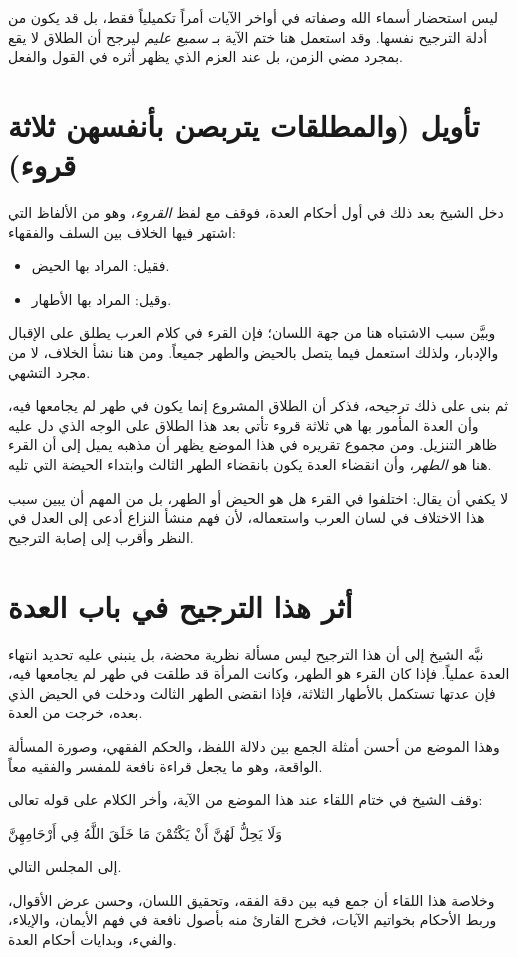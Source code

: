 \begin{fawaid}
ليس استحضار أسماء الله وصفاته في أواخر الآيات أمراً تكميلياً فقط، بل قد يكون من أدلة الترجيح نفسها. وقد استعمل  هنا ختم الآية بـ \textit{سميع عليم} ليرجح أن الطلاق لا يقع بمجرد مضي الزمن، بل عند العزم الذي يظهر أثره في القول والفعل.
\end{fawaid}

\separator

\section{تأويل (والمطلقات يتربصن بأنفسهن ثلاثة قروء)}
دخل الشيخ بعد ذلك في أول أحكام العدة، فوقف مع لفظ \textit{القروء}، وهو من الألفاظ التي اشتهر فيها الخلاف بين السلف والفقهاء:
\begin{itemize}
    \item فقيل: المراد بها الحيض.
    \item وقيل: المراد بها الأطهار.
\end{itemize}

وبيَّن  سبب الاشتباه هنا من جهة اللسان؛ فإن القرء في كلام العرب يطلق على الإقبال والإدبار، ولذلك استعمل فيما يتصل بالحيض والطهر جميعاً. ومن هنا نشأ الخلاف، لا من مجرد التشهي.

ثم بنى على ذلك ترجيحه، فذكر أن الطلاق المشروع إنما يكون في طهر لم يجامعها فيه، وأن العدة المأمور بها هي ثلاثة قروء تأتي بعد هذا الطلاق على الوجه الذي دل عليه ظاهر التنزيل. ومن مجموع تقريره في هذا الموضع يظهر أن مذهبه يميل إلى أن القرء هنا هو \textit{الطهر}، وأن انقضاء العدة يكون بانقضاء الطهر الثالث وابتداء الحيضة التي تليه.

\begin{fawaid}
لا يكفي أن يقال: اختلفوا في القرء هل هو الحيض أو الطهر، بل من المهم أن يبين سبب هذا الاختلاف في لسان العرب واستعماله، لأن فهم منشأ النزاع أدعى إلى العدل في النظر وأقرب إلى إصابة الترجيح.
\end{fawaid}

\section{أثر هذا الترجيح في باب العدة}
نبَّه الشيخ إلى أن هذا الترجيح ليس مسألة نظرية محضة، بل ينبني عليه تحديد انتهاء العدة عملياً. فإذا كان القرء هو الطهر، وكانت المرأة قد طلقت في طهر لم يجامعها فيه، فإن عدتها تستكمل بالأطهار الثلاثة، فإذا انقضى الطهر الثالث ودخلت في الحيض الذي بعده، خرجت من العدة.

وهذا الموضع من أحسن أمثلة الجمع بين دلالة اللفظ، والحكم الفقهي، وصورة المسألة الواقعة، وهو ما يجعل قراءة  نافعة للمفسر والفقيه معاً.

\separator

وقف الشيخ في ختام اللقاء عند هذا الموضع من الآية، وأخر الكلام على قوله تعالى: \begin{ayah}وَلَا يَحِلُّ لَهُنَّ أَنْ يَكْتُمْنَ مَا خَلَقَ اللَّهُ فِي أَرْحَامِهِنَّ\end{ayah} إلى المجلس التالي.

وخلاصة هذا اللقاء أن  جمع فيه بين دقة الفقه، وتحقيق اللسان، وحسن عرض الأقوال، وربط الأحكام بخواتيم الآيات، فخرج القارئ منه بأصول نافعة في فهم الأيمان، والإيلاء، والفيء، وبدايات أحكام العدة.
